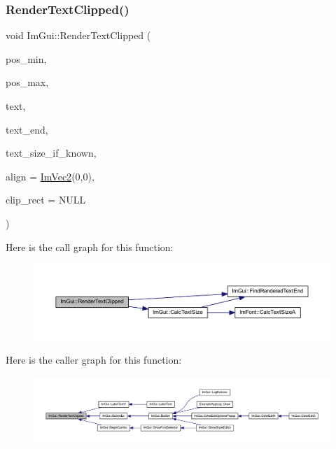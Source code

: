 \subsubsection{\texorpdfstring{Render\+Text\+Clipped()}{RenderTextClipped()}}
{\footnotesize\ttfamily void Im\+Gui\+::\+Render\+Text\+Clipped (\begin{DoxyParamCaption}\item[{const \mbox{\hyperlink{struct_im_vec2}{Im\+Vec2}} \&}]{pos\+\_\+min,  }\item[{const \mbox{\hyperlink{struct_im_vec2}{Im\+Vec2}} \&}]{pos\+\_\+max,  }\item[{const char $\ast$}]{text,  }\item[{const char $\ast$}]{text\+\_\+end,  }\item[{const \mbox{\hyperlink{struct_im_vec2}{Im\+Vec2}} $\ast$}]{text\+\_\+size\+\_\+if\+\_\+known,  }\item[{const \mbox{\hyperlink{struct_im_vec2}{Im\+Vec2}} \&}]{align = {\ttfamily \mbox{\hyperlink{struct_im_vec2}{Im\+Vec2}}(0,0)},  }\item[{const \mbox{\hyperlink{struct_im_rect}{Im\+Rect}} $\ast$}]{clip\+\_\+rect = {\ttfamily NULL} }\end{DoxyParamCaption})}

Here is the call graph for this function\+:
\nopagebreak
\begin{figure}[H]
\begin{center}
\leavevmode
\includegraphics[width=350pt]{namespace_im_gui_ab362eafae794c7364a6b96ea06f38eb9_cgraph}
\end{center}
\end{figure}
Here is the caller graph for this function\+:
\nopagebreak
\begin{figure}[H]
\begin{center}
\leavevmode
\includegraphics[width=350pt]{namespace_im_gui_ab362eafae794c7364a6b96ea06f38eb9_icgraph}
\end{center}
\end{figure}
\mbox{\label{namespace_im_gui_aa483b40f6899e1b289b4bf6c2673d1d2}} 
